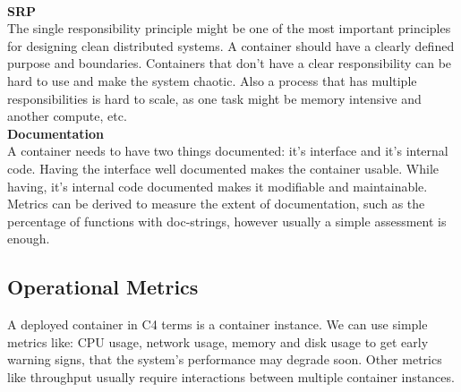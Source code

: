 \documentclass[12pt]{article}
\begin{document}
\\\textbf{SRP}\\
The single responsibility principle might be one of the most important principles for designing clean distributed systems. A container should have a clearly defined purpose and boundaries. Containers that don't have a clear responsibility can be hard to use and make the system chaotic. Also a process that has multiple responsibilities is hard to scale, as one task might be memory intensive and another compute, etc.
\\\textbf{Documentation}\\
A container needs to have two things documented: it's interface and it's internal code. Having the interface well documented makes the container usable. While having, it's internal code documented makes it modifiable and maintainable. Metrics can be derived to measure the extent of documentation, such as the percentage of functions with doc-strings, however usually a simple assessment is enough.

\subsection{Operational Metrics}
A deployed container in C4 terms is a container instance. We can use simple metrics like: CPU usage, network usage, memory and disk usage to get early warning signs, that the system's performance may degrade soon. Other metrics like throughput usually require interactions between multiple container instances.
\end{document}
